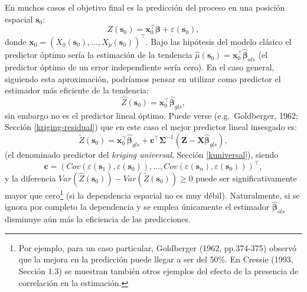 \documentclass[
  spanish,
]{book}
\theoremstyle{break}
\theoremstyle{definition}
\theoremstyle{definition}
\theoremstyle{definition}
\theoremstyle{definition}
\theoremstyle{remark}
\begin{document}
En muchos casos el objetivo final es la predicción del proceso en una posición espacial \(\mathbf{s}_{0}\):
\[Z(\mathbf{s}_{0} )=\mathbf{x}_0^{\top}\boldsymbol{\beta}+\varepsilon (\mathbf{s}_{0} ),\]
donde \(\mathbf{x}_0=\left( X_{0} (\mathbf{s}_{0} ), \ldots,X_{p} (\mathbf{s}_{0})\right)^{\top}\).
Bajo las hipótesis del modelo clásico el predictor óptimo sería la estimación de la tendencia \(\hat{\mu}(\mathbf{s}_{0} ) = \mathbf{x}_0^\top \hat{\boldsymbol{\beta}}_{ols}\) (el predictor óptimo de un error independiente sería cero).
En el caso general, siguiendo esta aproximación, podríamos pensar en utilizar como predictor el estimador más eficiente de la tendencia:
\[\hat{Z} (\mathbf{s}_{0})=\mathbf{x}_0^\top \hat{\boldsymbol{\beta}}_{gls},\]
sin embargo no es el predictor lineal óptimo. Puede verse (e.g.~Goldberger, 1962; Sección \ref{kriging-residual}) que en este caso el mejor predictor lineal insesgado es:
\begin{equation} 
  \tilde{Z}(\mathbf{s}_{0}) = \mathbf{x}_0^{\top}\hat{\boldsymbol{\beta}}_{gls} + \mathbf{c}^{\top} \boldsymbol{\Sigma}^{-1} \left( \mathbf{Z} - \mathbf{X}\hat{\boldsymbol{\beta}}_{gls} \right),
  \label{eq:predictor-kriging}
\end{equation}
(el denominado predictor del \emph{kriging universal}, Sección \ref{kuniversal}), siendo
\[\mathbf{c} = \left( Cov\left( \varepsilon (\mathbf{s}_{1} ),\varepsilon (\mathbf{s}_{0} )\right), \ldots, Cov\left( \varepsilon (\mathbf{s}_{n} ),\varepsilon (\mathbf{s}_{0} )\right) \right)^{\top},\]
y la diferencia \(Var( \hat{Z} (\mathbf{s}_{0} ) ) - Var( \tilde{Z} (\mathbf{s}_{0} ) ) \ge 0\) puede ser significativamente mayor que cero\footnote{Por ejemplo, para un caso particular, Goldberger (1962, pp.374-375) observó que la mejora en la predicción puede llegar a ser del 50\%. En Cressie (1993, Sección 1.3) se muestran también otros ejemplos del efecto de la presencia de correlación en la estimación.} (si la dependencia espacial no es muy débil).
Naturalmente, si se ignora por completo la dependencia y se emplea únicamente el estimador \(\hat{\boldsymbol{\beta}}_{ols}\) disminuye aún más la eficiencia de las predicciones.
\end{document}
